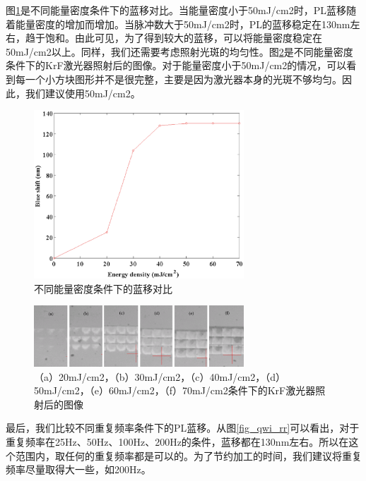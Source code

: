 \documentclass{ZJUthesis}
\begin{document}
图\ref{fig_qwi_energy}是不同能量密度条件下的蓝移对比。当能量密度小于50mJ/cm2时，PL蓝移随着能量密度的增加而增加。当脉冲数大于50mJ/cm2时，PL的蓝移稳定在130nm左右，趋于饱和。由此可见，为了得到较大的蓝移，可以将能量密度稳定在50mJ/cm2以上。同样，我们还需要考虑照射光斑的均匀性。图\ref{fig_qwi_energy2}是不同能量密度条件下的KrF激光器照射后的图像。对于能量密度小于50mJ/cm2的情况，可以看到每一个小方块图形并不是很完整，主要是因为激光器本身的光斑不够均匀。因此，我们建议使用50mJ/cm2。

\begin{figure}[!t]
    \centering
    \includegraphics[width=0.7\textwidth]{./Pictures/qwi_energy.eps}
    \caption{不同能量密度条件下的蓝移对比}
    \label{fig_qwi_energy}
\end{figure}

\begin{figure}[!t]
    \centering
    \includegraphics[width=0.7\textwidth]{./Pictures/qwi_energy2.eps}
    \caption{（a）20mJ/cm2，（b）30mJ/cm2，（c）40mJ/cm2，（d）50mJ/cm2，（e）60mJ/cm2，（f）70mJ/cm2条件下的KrF激光器照射后的图像}
    \label{fig_qwi_energy2}
\end{figure}

最后，我们比较不同重复频率条件下的PL蓝移。从图\ref{fig_qwi_rr}可以看出，对于重复频率在25Hz、50Hz、100Hz、200Hz的条件，蓝移都在130nm左右。所以在这个范围内，取任何的重复频率都是可以的。为了节约加工的时间，我们建议将重复频率尽量取得大一些，如200Hz。
\end{document}
